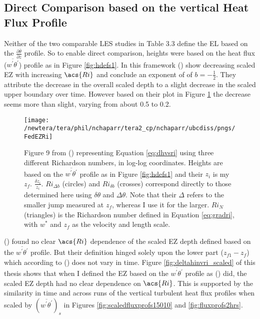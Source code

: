 \subsection{Direct Comparison based on the vertical Heat Flux Profile}

Neither of the two comparable \acs{LES} studies in Table 3.3 define the \acs{EL} based on the $\frac{\partial \overline{\theta}}{\partial z}$ profile.  So to enable direct comparison, heights were based on the heat flux ($\overline{w^{'}\theta^{'}}$) profile as in Figure \ref{fig:hdefs1}.  In this framework \citeauthor{FedConzMir04} (\citeyear{FedConzMir04}) show decreasing scaled \acs{EZ} with increasing $\acs{Ri}$ and conclude an exponent of of $b = -\frac{1}{2}$.  They attribute the decrease in the overall scaled depth to a slight decrease in the scaled upper boundary over time.  However based on their plot in Figure \ref{fig:FedEZRi} the decrease seems more than slight, varying from about 0.5 to 0.2.\\

\begin{figure}[htbp]
    \centering
    \texttt{[image: /newtera/tera/phil/nchaparr/tera2\_cp/nchaparr/ubcdiss/pngs/FedEZRi]}
    \caption[Plot of the relationship between scaled \acs{EZ} depth and Richardson number from \citeauthor{FedConzMir04}'s (\citeyear{FedConzMir04})]{Figure 9 from \citeauthor{FedConzMir04} (\citeyear{FedConzMir04}) representing Equation \ref{eq:dhvsri} using three different Richardson numbers, in log-log coordinates.  Heights are based on the $\overline{w^{'}\theta^{'}}$ profile as in Figure \ref{fig:hdefs1} and their $z_{i}$ is my $z_{f}$. $\frac{\delta z_{i}}{z_{i}}$. $Ri_{\Delta b}$ (circles) and $Ri_{\delta b}$ (crosses) correspond directly to those determined here using $\delta \theta$ and $\Delta \theta$.  Note that their $\Delta$ refers to the smaller jump measured at $z_{f}$, whereas I use it for the larger.  $Ri_{N}$ (triangles) is the Richardson number defined in Equation \ref{eq:gradri}, with $w^{*}$ and $z_{f}$ as the velocity and length scale.}
    \label{fig:FedEZRi}   %
\end{figure}


 \citeauthor{BrooksFowler2} (\citeyear{BrooksFowler2}) found no clear $\acs{Ri}$ dependence of the scaled \acs{EZ} depth defined based on the $\overline{w^{'}\theta^{'}}$ profile.  But their definition hinged solely upon the lower part ($z_{f1} - z_{f}$) which according to \citeauthor{FedConzMir04} (\citeyear{FedConzMir04}) does not vary in time.  Figure \ref{fig:deltahinvri_scaled} of this thesis shows that when I defined the \acs{EZ} based on the $\overline{w^{'}\theta^{'}}$ profile as \citeauthor{FedConzMir04} (\citeyear{FedConzMir04}) did, the scaled \acs{EZ} depth had no clear dependence on $\acs{Ri}$. This is supported by the similarity in time and across runs of the vertical turbulent heat flux profiles when scaled by $(\overline{w^{'}\theta^{'}})_{s}$ in Figures \ref{fig:scaledfluxprofs15010} and \ref{fig:fluxprofs2hrs}.\\

